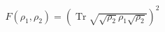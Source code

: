 \documentclass[preview]{standalone}
\begin{document}
\begin{align*}
F(\rho_1, \rho_2) = \left( \operatorname{Tr} \sqrt{\sqrt{\rho_2} \rho_1 \sqrt{\rho_2}} \right)^2
\end{align*}
\end{document}
